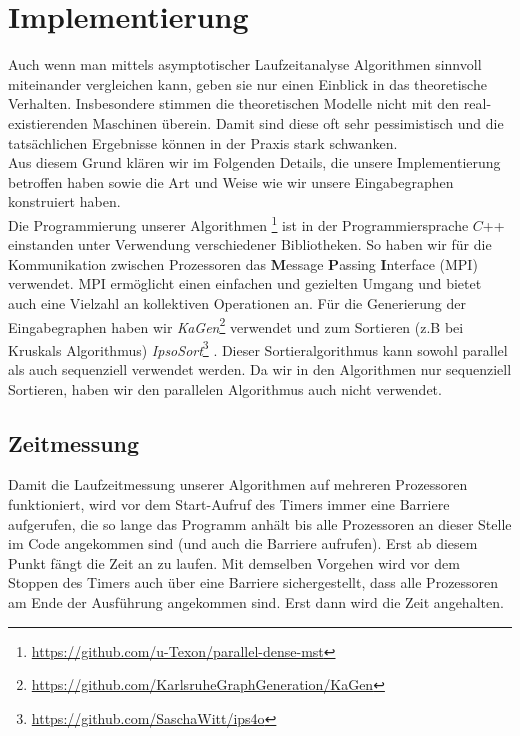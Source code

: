 \section{Implementierung}\label{Implementierung}
Auch wenn man mittels asymptotischer Laufzeitanalyse Algorithmen sinnvoll miteinander vergleichen kann, geben sie nur einen Einblick in das theoretische Verhalten. Insbesondere stimmen die theoretischen Modelle nicht mit den real-existierenden Maschinen überein. Damit sind diese oft sehr pessimistisch und die tatsächlichen Ergebnisse können in der Praxis stark schwanken.\\
Aus diesem Grund klären wir im Folgenden Details, die unsere Implementierung betroffen haben sowie die Art und Weise wie wir unsere Eingabegraphen konstruiert haben.\\
Die Programmierung unserer Algorithmen \footnote{\url{https://github.com/u-Texon/parallel-dense-mst}} ist in der Programmiersprache $C$++ einstanden unter Verwendung verschiedener Bibliotheken. So haben wir für die Kommunikation zwischen Prozessoren das \textbf{M}essage \textbf{P}assing \textbf{I}nterface (MPI) verwendet. MPI ermöglicht einen einfachen und gezielten Umgang und bietet auch eine Vielzahl an kollektiven Operationen an.
Für die Generierung der Eingabegraphen haben wir \textit{KaGen}\footnote{\url{https://github.com/KarlsruheGraphGeneration/KaGen}} \cite{funke2017communication,HubSan2020RMAT} verwendet und zum Sortieren (z.B bei Kruskals Algorithmus) 
\textit{IpsoSort}\footnote{\url{https://github.com/SaschaWitt/ips4o}} \cite{axtmann2017}. Dieser Sortieralgorithmus kann sowohl parallel als auch sequenziell verwendet werden. Da wir in den Algorithmen nur sequenziell Sortieren, haben wir den parallelen Algorithmus auch nicht verwendet.


\subsection{Zeitmessung}
Damit die Laufzeitmessung unserer Algorithmen auf mehreren Prozessoren funktioniert, wird vor dem Start-Aufruf des Timers immer eine Barriere aufgerufen, die so lange das Programm anhält bis alle Prozessoren an dieser Stelle im Code angekommen sind (und auch die Barriere aufrufen). Erst ab diesem Punkt fängt die Zeit an zu laufen. Mit demselben Vorgehen wird vor dem Stoppen des Timers auch über eine Barriere sichergestellt, dass alle Prozessoren am Ende der Ausführung angekommen sind. Erst dann wird die Zeit angehalten.

